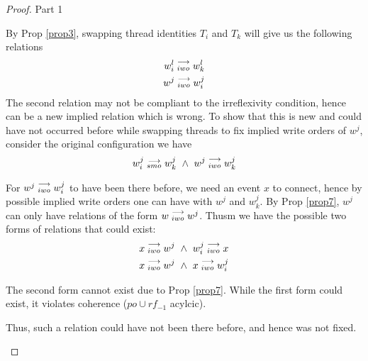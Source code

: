 \begin{proof}{Part 1}
\begin{itemize}
                        By Prop \ref{prop3}, swapping thread identities $T_i$ and $T_k$ will give us the following relations 
                        \begin{align*}
                            w_i^l\stackrel{\longrightarrow}{_{iwo}}w_k^l \\ 
                            w^j\stackrel{\longrightarrow}{_{iwo}}w_i^j 
                        \end{align*}
                        The second relation may not be compliant to the irreflexivity condition, hence can be a new implied relation which  is   wrong. To show that this is new and could have not occurred before while swapping threads to fix implied write  orders of  $w^j$, consider the original configuration we have 
                        \begin{align*}
                            \reln{w_i^j}{smo}{w_k^j} \ \wedge \ \reln{w^j}{iwo}{w_k^j}
                        \end{align*}

                        For $w^j\stackrel{\longrightarrow}{_{iwo}}w_i^j$ to have been there before, we need an event $x$ to connect, hence by possible implied  write    orders one can have with $w^j$ and $w_k^j$. By Prop \ref{prop7}, $w^j$ can only have relations of the form  $w\stackrel{\longrightarrow}{_{iwo}}w^j$. Thusm we have the possible two forms of relations that could exist:
                        \begin{align*}
                            \reln{x}{iwo}{w^j} \ \wedge \ \reln{w_i^j}{iwo}{x} \\
                            \reln{x}{iwo}{w^j} \ \wedge \ \reln{x}{iwo}{w_i^j} \\ 
                        \end{align*}

                        The second form cannot exist due to Prop \ref{prop7}. While the first form could exist, it violates coherence ($po  \cup rf_ {-1}$ acylcic). 

                        Thus, such a relation could have not been there before, and hence was not fixed. 

                \end{itemize}
            
        \end{proof}


